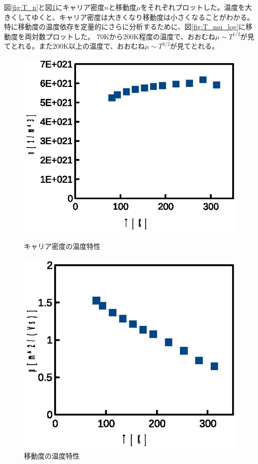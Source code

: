 \documentclass[11pt,a4]{jarticle}
\begin{document}
図\ref{fig:T_n}と図\ref{fig:T_mu}にキャリア密度$n$と移動度$\mu$をそれぞれプロットした。温度を大きくしてゆくと、キャリア密度は大きくなり移動度は小さくなることがわかる。
特に移動度の温度依存を定量的にさらに分析するために、図\ref{fig:T_mu_log}に移動度を両対数プロットした。
70Kから200K程度の温度で、おおむね$\mu \sim T^{1/2}$が見てとれる。また200K以上の温度で、おおむね$\mu \sim T^{3/2}$が見てとれる。
\begin{figure}[htbp]
 \begin{minipage}{0.5\hsize}
   \begin{center}
    \includegraphics[width=0.8\hsize]{./T_n.eps}
    \caption{キャリア密度の温度特性}
     \label{fig:T_n}
   \end{center}
 \end{minipage}
 \begin{minipage}{0.5\hsize}
   \begin{center}
    \includegraphics[width=0.8\hsize]{./T_mu.eps}
    \caption{移動度の温度特性}
     \label{fig:T_mu}
   \end{center}
 \end{minipage}
\end{figure}
\end{document}
